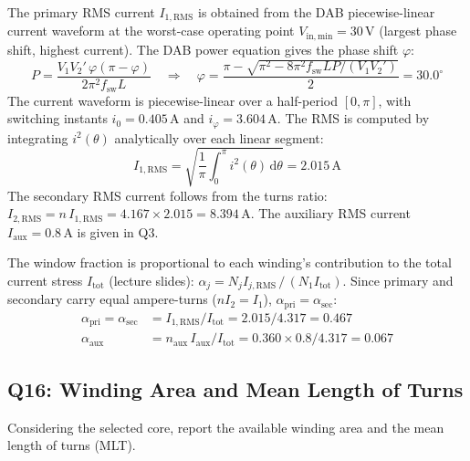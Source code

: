 \documentclass{PELsmallreport}
\begin{document}
\begin{framed}
The primary RMS current $I_{1,\mathrm{RMS}}$ is obtained from the DAB piecewise-linear current waveform at the worst-case operating point $V_\mathrm{in,min}=30\,\mathrm{V}$ (largest phase shift, highest current). The DAB power equation gives the phase shift $\varphi$:
\begin{equation}
    P = \frac{V_1 V_2' \,\varphi(\pi-\varphi)}{2\pi^2 f_\mathrm{sw} L} \quad\Rightarrow\quad \varphi = \frac{\pi - \sqrt{\pi^2 - 8\pi^2 f_\mathrm{sw} L P / (V_1 V_2')}}{2} = 30.0^\circ
\end{equation}
The current waveform is piecewise-linear over a half-period $[0,\pi]$, with switching instants $i_0 = 0.405\,\mathrm{A}$ and $i_\varphi = 3.604\,\mathrm{A}$. The RMS is computed by integrating $i^2(\theta)$ analytically over each linear segment:
\begin{equation}
    I_{1,\mathrm{RMS}} = \sqrt{\frac{1}{\pi}\int_0^{\pi} i^2(\theta)\,\mathrm{d}\theta} = 2.015\,\mathrm{A}
\end{equation}
The secondary RMS current follows from the turns ratio: $I_{2,\mathrm{RMS}} = n\,I_{1,\mathrm{RMS}} = 4.167\times2.015 = 8.394\,\mathrm{A}$. The auxiliary RMS current $I_\mathrm{aux}=0.8\,\mathrm{A}$ is given in Q3.

The window fraction is proportional to each winding's contribution to the total current stress $I_\mathrm{tot}$ (lecture slides): $\alpha_j = N_j I_{j,\mathrm{RMS}}\,/\,(N_1 I_\mathrm{tot})$. Since primary and secondary carry equal ampere-turns ($n I_2 = I_1$), $\alpha_\mathrm{pri} = \alpha_\mathrm{sec}$:
\begin{align}
    \alpha_\mathrm{pri} = \alpha_\mathrm{sec} &= I_{1,\mathrm{RMS}}/I_\mathrm{tot} = 2.015/4.317 = 0.467\\
    \alpha_\mathrm{aux} &= n_\mathrm{aux}\,I_\mathrm{aux}/I_\mathrm{tot} = 0.360\times0.8/4.317 = 0.067
\end{align}
\end{framed}

 \quad {} \quad {} \hfill{}


\subsection{Q16: Winding Area and Mean Length of Turns}
Considering the selected core, report the available winding area and the mean length of turns (MLT).
\end{document}
